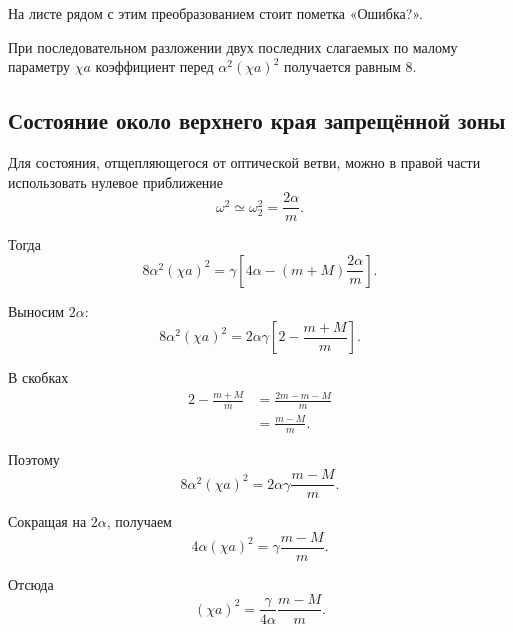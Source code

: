 \documentclass[../final.tex]{subfiles}
\begin{document}
На листе рядом с этим преобразованием стоит пометка
«Ошибка?».

При последовательном разложении двух последних слагаемых
по малому параметру $\chi a$
коэффициент перед $\alpha^2(\chi a)^2$
получается равным $8$.



\subsection*{Состояние около верхнего края запрещённой зоны}

Для состояния,
отщепляющегося от оптической ветви,
можно в правой части использовать
нулевое приближение
%
\begin{equation*}
    \omega^2
    \simeq
    \omega_2^2
    =
    \frac{2\alpha}{m}.
\end{equation*}
%

Тогда
%
\begin{equation*}
    8\alpha^2(\chi a)^2
    =
    \gamma
    \left[
        4\alpha
        -
        (m+M)
        \frac{2\alpha}{m}
    \right].
\end{equation*}
%

Выносим $2\alpha$:
%
\begin{equation*}
    8\alpha^2(\chi a)^2
    =
    2\alpha\gamma
    \left[
        2
        -
        \frac{m+M}{m}
    \right].
\end{equation*}
%

В скобках
%
\begin{align*}
    2-\frac{m+M}{m}
    &=
    \frac{2m-m-M}{m}
    \\
    &=
    \frac{m-M}{m}.
\end{align*}
%

Поэтому
%
\begin{equation*}
    8\alpha^2(\chi a)^2
    =
    2\alpha\gamma
    \frac{m-M}{m}.
\end{equation*}
%

Сокращая на $2\alpha$,
получаем
%
\begin{equation*}
    4\alpha(\chi a)^2
    =
    \gamma
    \frac{m-M}{m}.
\end{equation*}
%

Отсюда
%
\begin{equation*}
    (\chi a)^2
    =
    \frac{\gamma}{4\alpha}
    \frac{m-M}{m}.
\end{equation*}
%
\end{document}
